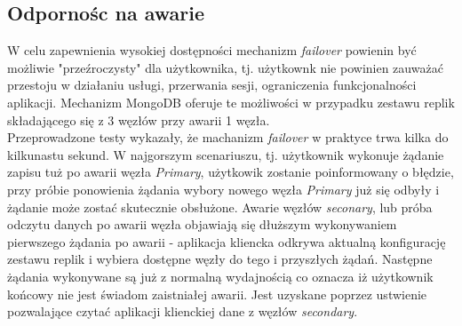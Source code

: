 \subsection{Odpornośc na awarie}
W celu zapewnienia wysokiej dostępności mechanizm \textit{failover} powienin być możliwie "przeźroczysty" dla użytkownika, tj. użytkownk nie powinien zauważać przestoju w działaniu usługi, przerwania sesji, ograniczenia funkcjonalności aplikacji. Mechanizm MongoDB oferuje te możliwości w przypadku zestawu replik składającego się z 3 węzłów przy awarii 1 węzła. \\
Przeprowadzone testy wykazały, że machanizm \textit{failover} w praktyce trwa kilka do kilkunastu sekund. W najgorszym scenariuszu, tj. użytkownik wykonuje żądanie zapisu tuż po awarii węzła \textit{Primary}, użytkowik zostanie poinformowany o błędzie, przy próbie ponowienia żądania wybory nowego węzła \textit{Primary} już się odbyły i żądanie może zostać skutecznie obsłużone. Awarie węzłów \textit{seconary}, lub próba odczytu danych po awarii węzła objawiają się dłuższym wykonywaniem pierwszego żądania po awarii - aplikacja kliencka odkrywa aktualną konfigurację zestawu replik i wybiera dostępne węzły do tego i przyszłych żądań. Następne żądania wykonywane są już z normalną wydajnością co oznacza iż użytkownik końcowy nie jest świadom zaistniałej awarii. Jest uzyskane poprzez ustwienie pozwalające czytać aplikacji klienckiej dane z węzłów \textit{secondary}.
